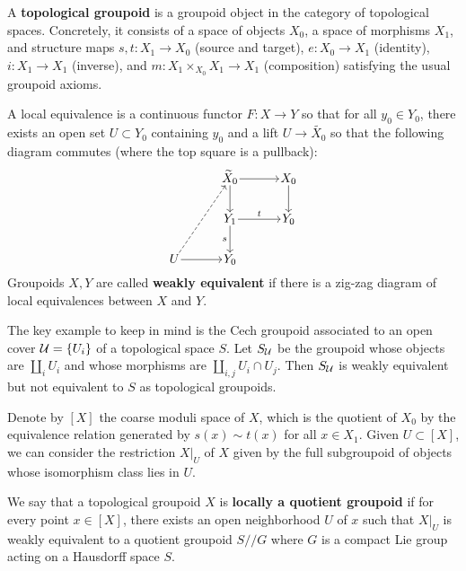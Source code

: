 \documentclass[12pt]{article}
\begin{document}
\begin{definition}
    A \textbf{topological groupoid} is a groupoid object in the category of topological spaces. Concretely, it consists of a space of objects $X_0$, a space of morphisms $X_1$, and structure maps $s,t:X_1\to X_0$ (source and target), $e:X_0\to X_1$ (identity), $i:X_1\to X_1$ (inverse), and $m:X_1\times_{X_0} X_1\to X_1$ (composition) satisfying the usual groupoid axioms.
\end{definition}

\begin{definition}
    A local equivalence is a continuous functor $F:X\to Y$ so that for all $y_0 \in Y_0$, there exists an open set $U\subset Y_0$ containing $y_0$ and a lift $U \to \widetilde{X_0}$ so that the following diagram commutes (where the top square is a pullback):
    \[
        \begin{tikzcd}[
                row sep=2.2em,
                column sep=3.2em,
                cells={nodes={inner sep=1pt}}
            ]
            & \widetilde X_0 \arrow[r] \arrow[d] & X_0 \arrow[d] \\
            & Y_1 \arrow[r, "t"] \arrow[d, "s"'] & Y_0 \\
            U \arrow[r] \arrow[uur, dashed] & Y_0 &
        \end{tikzcd}
    \]
Groupoids $X,Y$ are called \textbf{weakly equivalent} if there is a zig-zag diagram of local equivalences between $X$ and $Y$.
\end{definition}

The key example to keep in mind is the Cech groupoid associated to an open cover ${\mathcal{U}} = \{U_i\}$ of a topological space $S$. Let $S_{{\mathcal{U}}}$ be the groupoid whose objects are $\coprod_i U_i$ and whose morphisms are $\coprod_{i,j} U_i\cap U_j$. Then $S_{{\mathcal{U}}}$ is weakly equivalent but not equivalent to $S$ as topological groupoids. 

Denote by $[X]$ the coarse moduli space of $X$, which is the quotient of $X_0$ by the equivalence relation generated by $s(x)\sim t(x)$ for all $x\in X_1$. Given $U \subset [X]$, we can consider the restriction $X|_U$ of $X$ given by the full subgroupoid of objects whose isomorphism class lies in $U$. 

\begin{definition}
    We say that a topological groupoid $X$ is \textbf{locally a quotient groupoid} if for every point $x\in [X]$, there exists an open neighborhood $U$ of $x$ such that $X|_U$ is weakly equivalent to a quotient groupoid $S//G$ where $G$ is a compact Lie group acting on a Hausdorff space $S$.
\end{definition}
\end{document}
